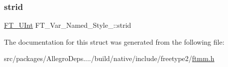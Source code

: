 \subsubsection{\texorpdfstring{strid}{strid}}
{\footnotesize\ttfamily \hyperlink{fttypes_8h_abcb8db4dbf35d2b55a9e8c7b0926dc52}{F\+T\+\_\+\+U\+Int} F\+T\+\_\+\+Var\+\_\+\+Named\+\_\+\+Style\+\_\+\+::strid}



The documentation for this struct was generated from the following file\+:\begin{DoxyCompactItemize}
\item 
src/packages/\+Allegro\+Deps..../build/native/include/freetype2/\hyperlink{ftmm_8h}{ftmm.\+h}\end{DoxyCompactItemize}
